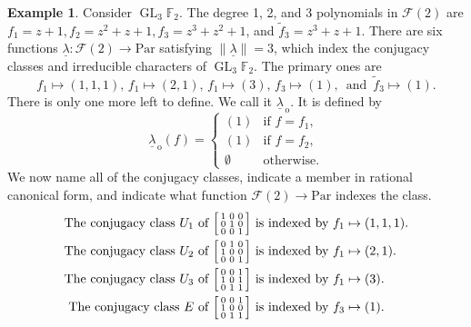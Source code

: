 \documentclass[10pt]{article}
\theoremstyle{definition}
\newtheorem{example}[theorem]{Example}
\DeclareMathOperator{\GL}{GL}
\newcommand{\F}{\mathbb{F}}
\newcommand{\CF}{\mathcal{F}}
\newcommand{\Par}{\text{Par}}
\newcommand{\ulambda}{{\underline{\lambda}}}
\begin{document}
\begin{example}
\label{conj_class_example}
Consider $\GL_3 \F_2$.
The degree 1, 2, and 3 polynomials in $\CF (2)$ are
$f_1 = z+1, f_2 = z^2+z+1, f_3 = z^3+z^2+1$, and $\tilde{f}_3 = z^3+z+1$.
There are six functions $\ulambda : \CF (2) \to \Par$ satisfying $\| \ulambda \| = 3$, which index the conjugacy classes and irreducible characters of $\GL_3 \F_2$. The primary ones are
$$
f_1 \mapsto (1,1,1), \,
f_1 \mapsto (2,1), \,
f_1 \mapsto (3), \,
f_3 \mapsto (1), \,
\text{ and } \,
\tilde{f}_3 \mapsto (1).
$$
There is only one more left to define. We call it $\ulambda_{\,\mathrm{o}}$. It is defined by
$$ \ulambda_{\,\mathrm{o}} (f) =
\begin{cases}
(1) & \text{if } f = f_1, \\
(1) & \text{if } f = f_2, \\
\emptyset & \text{otherwise.}
\end{cases}
$$
We now name all of the conjugacy classes, indicate a member in rational canonical form, and indicate what function $\CF (2) \to \Par$ indexes the class.
\begin{align*}
\text{The conjugacy class } U_{1} \text{ of }
\begin{bsmallmatrix}
1 & 0 & 0 \\
0 & 1 & 0 \\
0 & 0 & 1
\end{bsmallmatrix}
&
\text{ is indexed by }
f_1 \mapsto (1,1,1). \\
\text{The conjugacy class } U_{2} \text{ of }
\begin{bsmallmatrix}
0 & 1 & 0 \\
1 & 0 & 0 \\
0 & 0 & 1
\end{bsmallmatrix}
&
\text{ is indexed by }
f_1 \mapsto (2,1). \\
\text{The conjugacy class } U_{3} \text{ of }
\begin{bsmallmatrix}
0 & 0 & 1 \\
1 & 0 & 1 \\
0 & 1 & 1
\end{bsmallmatrix}
&
\text{ is indexed by }
f_1 \mapsto (3). \\
\text{The conjugacy class } E \text{ of }
\begin{bsmallmatrix}
0 & 0 & 1 \\
1 & 0 & 0 \\
0 & 1 & 1
\end{bsmallmatrix}
&
\text{ is indexed by }
f_3 \mapsto (1). \\

\end{align*}
\end{example}
\end{document}
